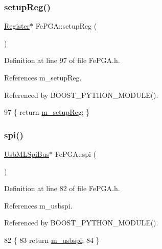 \subsubsection{\texorpdfstring{setup\+Reg()}{setupReg()}}
{\footnotesize\ttfamily \hyperlink{classRegister}{Register}$\ast$ Fe\+P\+G\+A\+::setup\+Reg (\begin{DoxyParamCaption}{ }\end{DoxyParamCaption})\hspace{0.3cm}{\ttfamily [inline]}}



Definition at line 97 of file Fe\+P\+G\+A.\+h.



References m\+\_\+setup\+Reg.



Referenced by B\+O\+O\+S\+T\+\_\+\+P\+Y\+T\+H\+O\+N\+\_\+\+M\+O\+D\+U\+L\+E().


\begin{DoxyCode}
97 \{ \textcolor{keywordflow}{return} \hyperlink{classFePGA_a0255fe229013986b4387c3a75ddf4e97}{m\_setupReg};  \}
\end{DoxyCode}
\mbox{\label{classFePGA_ab54f9f61e87f1cced6c4ba19eb38a848}} 
\subsubsection{\texorpdfstring{spi()}{spi()}}
{\footnotesize\ttfamily \hyperlink{classUsbMLSpiBus}{Usb\+M\+L\+Spi\+Bus}$\ast$ Fe\+P\+G\+A\+::spi (\begin{DoxyParamCaption}{ }\end{DoxyParamCaption})\hspace{0.3cm}{\ttfamily [inline]}}



Definition at line 82 of file Fe\+P\+G\+A.\+h.



References m\+\_\+usbspi.



Referenced by B\+O\+O\+S\+T\+\_\+\+P\+Y\+T\+H\+O\+N\+\_\+\+M\+O\+D\+U\+L\+E().


\begin{DoxyCode}
82                     \{
83     \textcolor{keywordflow}{return} \hyperlink{classFePGA_a922a56250b29c9842cdb8095cae8c976}{m\_usbspi};
84   \}
\end{DoxyCode}
\mbox{\label{classFePGA_a721de3fa12e207392cd6156027d2c776}} 
